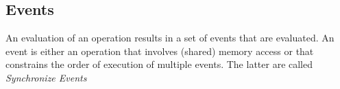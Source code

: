     \subsection{Events}
        
        An evaluation of an operation results in a set of events that are evaluated. An event is either an operation that involves (shared) memory access or that constrains the order of execution of multiple events. The latter are called \textit{Synchronize Events}

